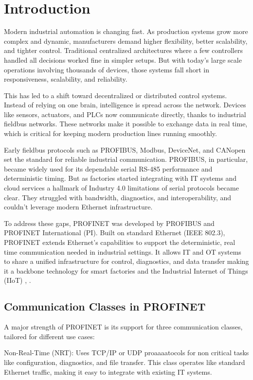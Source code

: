 \documentclass[conference]{IEEEtran}
\begin{document}
\section{Introduction}
Modern industrial automation is changing fast. As production systems grow more complex and dynamic, manufacturers demand higher flexibility, better scalability, and tighter control. Traditional centralized architectures where a few controllers handled all decisions worked fine in simpler setups. But with today’s large scale operations involving thousands of devices, those systems fall short in responsiveness, scalability, and reliability.

This has led to a shift toward decentralized or distributed control systems. Instead of relying on one brain, intelligence is spread across the network. Devices like sensors, actuators, and PLCs now communicate directly, thanks to industrial fieldbus networks. These networks make it possible to exchange data in real time, which is critical for keeping modern production lines running smoothly.

Early fieldbus protocols such as PROFIBUS, Modbus, DeviceNet, and CANopen set the standard for reliable industrial communication. PROFIBUS, in particular, became widely used for its dependable serial RS-485 performance and deterministic timing. But as factories started integrating with IT systems and cloud services a hallmark of Industry 4.0 limitations of serial protocols became clear. They struggled with bandwidth, diagnostics, and interoperability, and couldn’t leverage modern Ethernet infrastructure.

To address these gaps, PROFINET was developed by PROFIBUS and PROFINET International (PI). Built on standard Ethernet (IEEE 802.3), PROFINET extends Ethernet’s capabilities to support the deterministic, real time communication needed in industrial settings. It allows IT and OT systems to share a unified infrastructure for control, diagnostics, and data transfer making it a backbone technology for smart factories and the Industrial Internet of Things (IIoT) \cite{galloway2012industrial}, \cite{neumann2007communication}.

\subsection{Communication Classes in PROFINET} 
A major strength of PROFINET is its support for three communication classes, tailored for different use cases:

Non-Real-Time (NRT): Uses TCP/IP or UDP proaaaatocols for non critical tasks like configuration, diagnostics, and file transfer. This class operates like standard Ethernet traffic, making it easy to integrate with existing IT systems.
\end{document}
